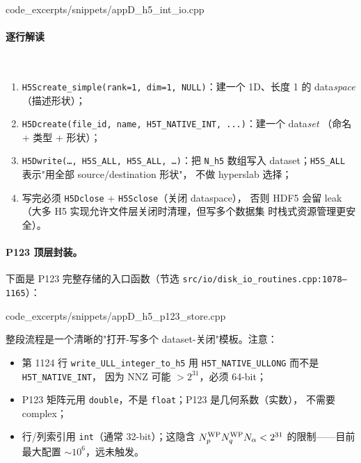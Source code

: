 
{code_excerpts/snippets/appD_h5_int_io.cpp}

\paragraph{逐行解读}\

\begin{enumerate}
\item \texttt{H5Screate\_simple(rank=1, dim={1}, NULL)}：建一个 1D、长度 1 的
      data\emph{space}（描述形状）；
\item \texttt{H5Dcreate(file\_id, name, H5T\_NATIVE\_INT, ...)}：建一个 data\emph{set}
      （命名 + 类型 + 形状）；
\item \texttt{H5Dwrite(\dots, H5S\_ALL, H5S\_ALL, \dots)}：把 \texttt{N\_h5}
      数组写入 dataset；\texttt{H5S\_ALL} 表示"用全部 source/destination 形状"，
      不做 hyperslab 选择；
\item 写完必须 \texttt{H5Dclose} + \texttt{H5Sclose}（关闭 dataspace），
      否则 HDF5 会留 leak（大多 H5 实现允许文件层关闭时清理，但写多个数据集
      时栈式资源管理更安全）。
\end{enumerate}

\paragraph{P123 顶层封装。}
下面是 P123 完整存储的入口函数（节选 \texttt{src/io/disk\_io\_routines.cpp:1078--1165}）：


{code_excerpts/snippets/appD_h5_p123_store.cpp}

整段流程是一个清晰的"打开-写多个 dataset-关闭"模板。注意：
\begin{itemize}
\item 第 1124 行 \texttt{write\_ULL\_integer\_to\_h5} 用
      \texttt{H5T\_NATIVE\_ULLONG} 而不是 \texttt{H5T\_NATIVE\_INT}，
      因为 NNZ 可能 $>2^{31}$，必须 64-bit；
\item P123 矩阵元用 \texttt{double}，不是 \texttt{float}；P123 是几何系数（实数），
      不需要 complex；
\item 行/列索引用 \texttt{int}（通常 32-bit）；这隐含 ${N_{p}^{\text{WP}}}{N_{q}^{\text{WP}}}N_\alpha < 2^{31}$
      的限制——目前最大配置 $\sim 10^{6}$，远未触发。
\end{itemize}

